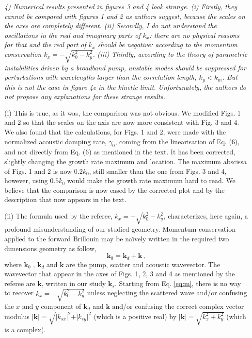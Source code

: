 \documentclass{article}
\begin{document}
\textit{
4) Numerical results presented in figures 3 and 4 look strange. (i) Firstly, they cannot be compared with figures 1 and 2 as authors suggest, because the scales on the axes are completely different. (ii) Secondly, I do not understand the oscillations in the real and imaginary parts of $k_x$: there are no physical reasons for that and the real part of $k_x$ should be negative: according to the momentum conservation $k_x = - \sqrt{k_0^2 - k_y^2}$. (iii) Thirdly, according to the theory of parametric instabilities driven by a broadband pump, unstable modes should be suppressed for perturbations with wavelengths larger than the correlation length, $k_y < k_m$. But this is not the case in figure 4e in the kinetic limit. Unfortunately, the authors do not propose any explanations for these strange results. }

(i) This is true, as it was, the comparison was not obvious.  We modified Figs. 1 and 2 so that the scales on the axis are now more consistent with Fig. 3  and 4. We also found that the calculations, for Figs. 1 and 2, were made with the normalized acoustic damping rate, $\gamma_0$, coming from the linearisation of Eq. (6), and not directly from Eq. (6) as mentioned in the text. It has been corrected, slightly changing the growth rate maximum and location. 
The maximum abscissa of Figs. 1 and 2 is now $0.2k_0$, still smaller than the one from Figs. 3 and 4, however, using $0.5k_0$ would make the growth rate maximum hard to read. 
We believe that the comparison is now eased by the corrected plot and by the description that now appears in the text. 

(ii) The formula used by the referee, $k_x = - \sqrt{k_0^2 - k_y^2}$, characterizes, here again, a profound misunderstanding of our studied geometry. Momentum conservation applied to the forward Brillouin may be na\"ively written in the required two dimensions geometry as follow,
\begin{equation} \label{eq:m}
    \mathbf{k}_0 = \mathbf{k}_d  + \mathbf{k}\, ,
\end{equation}
where  $\mathbf{k}_0$ , $ \mathbf{k}_d $ and  $\mathbf{k}$ are the pump, scatter and acoustic wavevector. The wavevector that appear in the axes of Figs. 1, 2, 3 and 4 as mentioned by the referee are $\mathbf{k}$, written in our study $\mathbf{k}_s$. Starting from Eq. \eqref{eq:m}, there is no way to recover  $k_x = - \sqrt{k_0^2 - k_y^2}$ unless neglecting the scattered wave and/or confusing the $x$ and $y$ component of $\mathbf{k}_d$ and $\mathbf{k}$ and/or confusing the correct complex vector modulus $\vert \mathbf{k}\vert =\sqrt{\vert k_{sx}\vert ^2 + \vert k_{sy}\vert ^2 }$ (which is a positive real) by  $\vert \mathbf{k}\vert =\sqrt{k_{x} ^2 + k_{y} ^2 }$ (which is a complex). 
\end{document}
